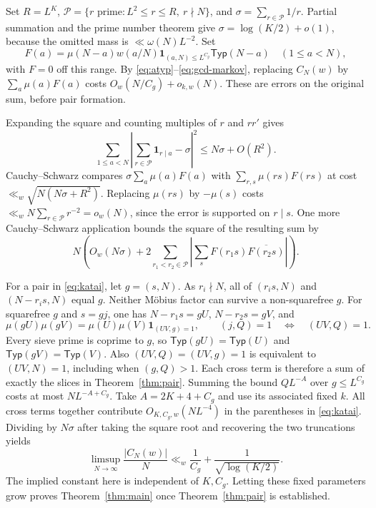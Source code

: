 \documentclass[11pt]{amsart}
\numberwithin{equation}{section}
\theoremstyle{remark}
\newcommand{\one}{\mathbf 1}
\newcommand{\Typ}{\mathsf{Typ}}
\begin{document}
Set $R=L^K$, $\mathcal P=\{r\text{ prime}:L^2\le r\le R,\ r\nmid N\}$, and $\sigma=\sum_{r\in\mathcal P}1/r$. Partial summation and the prime number theorem give $\sigma=\log(K/2)+o(1)$, because the omitted mass is $\ll\omega(N)L^{-2}$. Set
\[
 F(a)=\mu(N-a)w(a/N)\one_{(a,N)\le L^{C_g}}\Typ(N-a)
 \quad(1\le a<N),
\]
with $F=0$ off this range. By \eqref{eq:atyp}--\eqref{eq:gcd-markov}, replacing $C_N(w)$ by $\sum_a\mu(a)F(a)$ costs $O_w(N/C_g)+o_{k,w}(N)$. These are errors on the original sum, before pair formation.

Expanding the square and counting multiples of $r$ and $r r'$ gives
\[
 \sum_{1\le a<N}\left|\sum_{r\in\mathcal P}\one_{r\mid a}-\sigma\right|^2
 \le N\sigma+O(R^2).
\]
Cauchy--Schwarz compares $\sigma\sum_a\mu(a)F(a)$ with $\sum_{r,s}\mu(rs)F(rs)$ at cost $\ll_w\sqrt{N(N\sigma+R^2)}$. Replacing $\mu(rs)$ by $-\mu(s)$ costs $\ll_w N\sum_{r\in\mathcal P}r^{-2}=o_w(N)$, since the error is supported on $r\mid s$. One more Cauchy--Schwarz application bounds the square of the resulting sum by
\begin{equation}\label{eq:katai}
 N\left(O_w(N\sigma)+2\sum_{r_1<r_2\in\mathcal P}
       \left|\sum_s F(r_1s)\overline{F(r_2s)}\right|\right).
\end{equation}

For a pair in \eqref{eq:katai}, let $g=(s,N)$. As $r_i\nmid N$, all of $(r_i s,N)$ and $(N-r_i s,N)$ equal $g$. Neither M\"obius factor can survive a non-squarefree $g$. For squarefree $g$ and $s=gj$, one has $N-r_1s=gU$, $N-r_2s=gV$, and
\begin{equation}\label{eq:gcd-slice}
 \mu(gU)\mu(gV)=\mu(U)\mu(V)\one_{(UV,g)=1},\qquad
 (j,Q)=1\quad\Longleftrightarrow\quad(UV,Q)=1.
\end{equation}
Every sieve prime is coprime to $g$, so $\Typ(gU)=\Typ(U)$ and $\Typ(gV)=\Typ(V)$. Also $(UV,Q)=(UV,g)=1$ is equivalent to $(UV,N)=1$, including when $(g,Q)>1$. Each cross term is therefore a sum of exactly the slices in Theorem~\ref{thm:pair}. Summing the bound $QL^{-A}$ over $g\le L^{C_g}$ costs at most $NL^{-A+C_g}$. Take $A=2K+4+C_g$ and use its associated fixed $k$. All cross terms together contribute $O_{K,C_g,w}(NL^{-4})$ in the parentheses in \eqref{eq:katai}. Dividing by $N\sigma$ after taking the square root and recovering the two truncations yields
\begin{equation}\label{eq:limsup}
 \limsup_{N\to\infty}\frac{|C_N(w)|}{N}
 \ll_w \frac{1}{C_g}+\frac{1}{\sqrt{\log(K/2)}}.
\end{equation}
The implied constant here is independent of $K,C_g$. Letting these fixed parameters grow proves Theorem~\ref{thm:main} once Theorem~\ref{thm:pair} is established.
\end{document}
